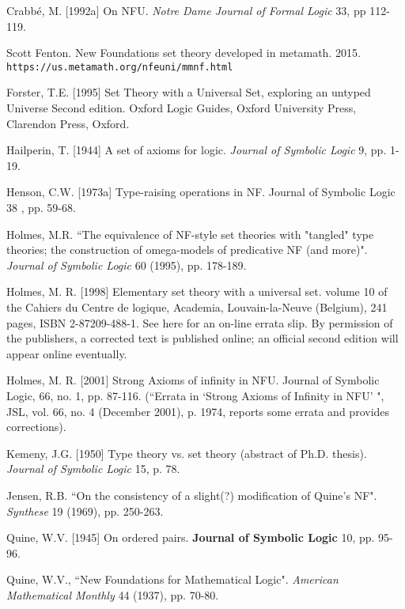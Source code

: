 \documentclass[112pt]{article}
\theoremstyle{definition}
\theoremstyle{remark}
\begin{document}
\begin{thebibliography}{99}


  Crabb\'{e}, M. [1992a]
On NFU.
{\em Notre Dame Journal of Formal Logic\/} 33, pp 112-119.

  Scott Fenton.  New Foundations set theory developed in metamath.  2015.  {\tt https://us.metamath.org/nfeuni/mmnf.html}

  Forster, T.E. [1995]
Set Theory with a Universal Set, exploring an untyped Universe
Second edition. Oxford Logic Guides, Oxford University Press, Clarendon Press, Oxford.

 Hailperin, T. [1944]
A set of axioms for logic.
{\em Journal of Symbolic Logic\/} 9, pp. 1-19.



   Henson, C.W. [1973a]
Type-raising operations in NF.
Journal of Symbolic Logic 38 , pp. 59-68.

  Holmes, M.R.
``The equivalence of NF-style set theories with "tangled" type theories; the construction of omega-models of predicative NF (and more)".
{\em Journal of Symbolic Logic\/} 60 (1995), pp. 178-189.

  Holmes, M. R. [1998]
Elementary set theory with a universal set.
volume 10 of the Cahiers du Centre de logique, Academia, Louvain-la-Neuve (Belgium), 241 pages, ISBN 2-87209-488-1. See here for an on-line errata slip. By permission of the publishers, a corrected text is published online; an official second edition will appear online eventually.

   Holmes, M. R. [2001]
Strong Axioms of infinity in NFU.
Journal of Symbolic Logic, 66, no. 1, pp. 87-116.  \newline(``Errata in `Strong
Axioms of Infinity in NFU' ", JSL, vol. 66, no. 4 (December
2001), p. 1974, reports some errata and provides corrections).

  Kemeny, J.G. [1950]
Type theory vs. set theory (abstract of Ph.D. thesis).
{\em Journal of Symbolic Logic\/} 15, p. 78.

  Jensen, R.B.
``On the consistency of a slight(?) modification of Quine's NF".
{\em Synthese\/} 19 (1969), pp. 250-263.

  Quine, W.V. [1945]
On ordered pairs.
{\bf Journal of Symbolic Logic\/} 10, pp. 95-96.

  Quine, W.V.,
``New Foundations for Mathematical Logic".
{\em American Mathematical Monthly\/} 44 (1937), pp. 70-80.


\end{thebibliography}
\end{document}

